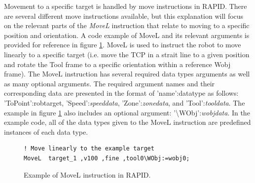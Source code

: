 \documentclass{cslthse-msc}
\begin{document}
Movement to a specific target is handled by move instructions in RAPID. There are several different move instructions available, but this explanation will focus on the relevant parts of the \textit{MoveL} \cite[Sec. 1.158]{ABB:rapid_instructions} instruction that relate to moving to a specific position and orientation. A code example of MoveL and its relevant arguments is provided for reference in figure \ref{fig:RAPID_movel}. MoveL is used to instruct the robot to move linearly to a specific target (i.e. move the TCP in a strait line to a given position and rotate the Tool frame to a specific orientation within a reference Wobj frame). The MoveL instruction has several required data types arguments as well as many optional arguments. The required argument names and their corresponding data are presented in the format of 'name':datatype as follows: 'ToPoint':robtarget, 'Speed':\textit{speeddata}, 'Zone':\textit{zonedata}, and 'Tool':\textit{tooldata}. The example in figure \ref{fig:RAPID_movel} also includes an optional argument: '\textbackslash WObj':\textit{wobjdata}. In the example code, all of the data types given to the MoveL instruction are predefined instances of each data type. 

\lstset{language=RAPID}
\begin{figure}[H]
\centering
\begin{lstlisting}
! Move linearly to the example target
MoveL  target_1 ,v100 ,fine ,tool0\WObj:=wobj0;
\end{lstlisting}
\caption{Example of MoveL instruction in RAPID.}
\label{fig:RAPID_movel}
\end{figure}
\end{document}
